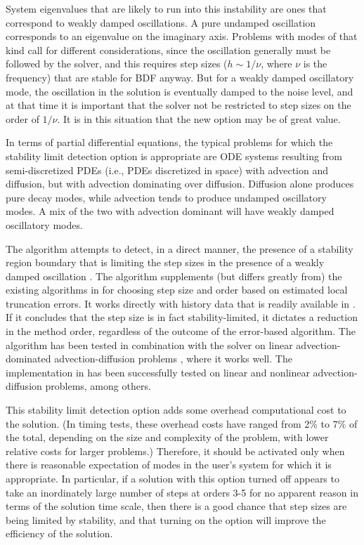 System eigenvalues that are likely to run into this instability are
ones that correspond to weakly damped oscillations.  A pure undamped
oscillation corresponds to an eigenvalue on the imaginary axis.
Problems with modes of that kind call for different considerations,
since the oscillation generally must be followed by the solver, and
this requires step sizes ($h \sim 1/\nu$, where $\nu$ is the frequency) 
that are stable for BDF anyway.  But for a weakly damped oscillatory mode,
the oscillation in the solution is eventually damped to the noise level, 
and at that time it is important that the solver not be restricted to step 
sizes on the order of $1/\nu$.  It is in this situation that the new option may
be of great value.

In terms of partial differential equations, the typical problems for
which the stability limit detection option is appropriate are
ODE systems resulting from semi-discretized PDEs (i.e., PDEs discretized 
in space) with advection and diffusion, but with advection dominating 
over diffusion.
Diffusion alone produces pure decay modes, while advection tends to
produce undamped oscillatory modes.  A mix of the two with advection
dominant will have weakly damped oscillatory modes.

The {\stald} algorithm attempts to detect, in a direct
manner, the presence of a stability region boundary that is limiting
the step sizes in the presence of a weakly damped oscillation \cite{Hin:92}.
The algorithm supplements (but differs greatly from) the existing
algorithms in {\cvode} for choosing step size and order based on
estimated local truncation errors.  It works directly
with history data that is readily available in {\cvode}.  If it concludes
that the step size is in fact stability-limited, it dictates a
reduction in the method order, regardless of the outcome of the
error-based algorithm.  The {\stald} algorithm has been tested in
combination with the {\vode} solver on linear advection-dominated
advection-diffusion problems \cite{Hin:95}, where it works well.  The
implementation in {\cvode} has been successfully tested on linear 
and nonlinear advection-diffusion problems, among others.

This stability limit detection option adds some overhead computational
cost to the {\cvode} solution.  (In timing tests, these overhead costs
have ranged from 2\% to 7\% of the total, depending on the size and
complexity of the problem, with lower relative costs for larger
problems.)  Therefore, it should be activated only when there is
reasonable expectation of modes in the user's system for which it is
appropriate.  In particular, if a {\cvode} solution with this option
turned off appears to take an inordinately large number of steps at
orders 3-5 for no apparent reason in terms of the solution time scale,
then there is a good chance that step sizes are being limited by
stability, and that turning on the option will improve the efficiency
of the solution. 


